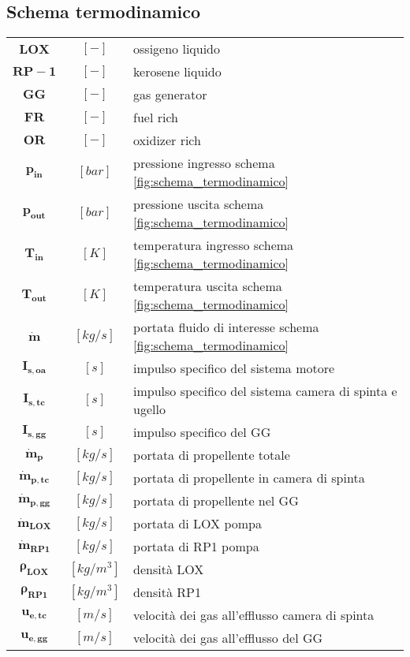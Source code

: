 \begin{multicols}{2}
	\subsection{Schema termodinamico}
	\begin{tabularx}{\linewidth}{ccX}
		$\bm{LOX}$ & $[-]$ & ossigeno liquido \\
		$\bm{RP-1}$ & $[-]$ & kerosene liquido \\
		$\bm{GG}$ & $[-]$ & gas generator \\
		$\bm{FR}$ & $[-]$ & fuel rich \\
		$\bm{OR}$ & $[-]$ & oxidizer rich \\
		$\bm{p_{in}}$ & $[bar]$ & pressione ingresso schema \autoref{fig:schema_termodinamico}\\
		$\bm{p_{out}}$ & $[bar]$ & pressione uscita schema \autoref{fig:schema_termodinamico}\\
		$\bm{T_{in}}$ & $[K]$ & temperatura ingresso schema \autoref{fig:schema_termodinamico}\\
		$\bm{T_{out}}$ & $[K]$ & temperatura uscita schema \autoref{fig:schema_termodinamico}\\
		$\bm{\dot{m}}$ & $[kg/s]$ & portata fluido di interesse schema \autoref{fig:schema_termodinamico}\\
		$\bm{I_{s,oa}}$ & $[s]$ & impulso specifico del sistema motore\\
		$\bm{I_{s,tc}}$ & $[s]$ & impulso specifico del sistema camera di spinta e ugello \\
		$\bm{I_{s,gg}}$ & $[s]$ & impulso specifico del GG\\
		$\bm{\dot{m}_{p}}$ & $[kg/s]$ & portata di propellente totale \\
		$\bm{\dot{m}_{p,tc}}$ & $[kg/s]$ & portata di propellente in camera di spinta \\
		$\bm{\dot{m}_{p,gg}}$ & $[kg/s]$ & portata di propellente nel GG \\
		$\bm{\dot{m}_{LOX}}$ & $[kg/s]$ & portata di LOX pompa \\
		$\bm{\dot{m}_{RP1}}$ & $[kg/s]$ & portata di RP1 pompa\\
		$\bm{\rho_{LOX}}$ & $[kg/m^3]$ & densità LOX \\
		$\bm{\rho_{RP1}}$ & $[kg/m^3]$ & densità RP1 \\
		$\bm{u_{e,tc}}$ & $[m/s]$ & velocità dei gas all'efflusso camera di spinta \\
		$\bm{u_{e,gg}}$ & $[m/s]$ & velocità dei gas all'efflusso del GG \\

\end{tabularx}
\end{multicols}
